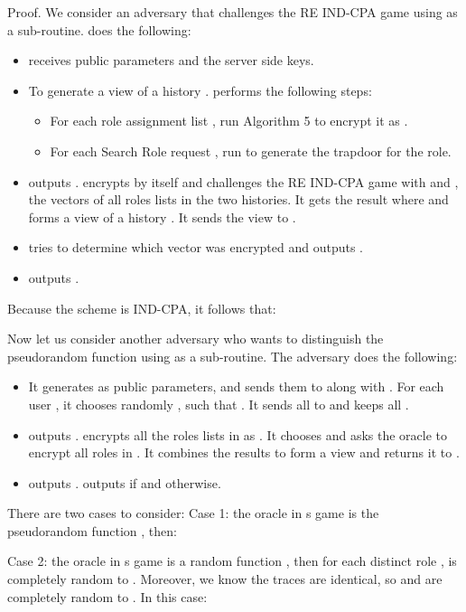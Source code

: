 \documentclass[final,5p,times,twocolumn]{elsarticle}
\begin{document}
Proof. We consider an adversary  that challenges the RE IND-CPA game using  as a sub-routine.  does the following:
\begin{itemize}
\item  receives public parameters  and the server side  keys. 


\item To generate a view of a history .  performs the following steps:
\begin{itemize}
\item For each role assignment list , run Algorithm 5 to encrypt it as . 
\item For each Search Role request , run  to generate the trapdoor  for the role.
\end{itemize}

\item  outputs .  encrypts  by itself and challenges the RE IND-CPA game with  and , the vectors of all roles lists in the two histories. It gets the result  where  and forms a view of a history . It sends the view to .

\item  tries to determine which vector was encrypted and outputs .

\item  outputs .

\end{itemize}

Because the  scheme is IND-CPA, it follows that:



Now let us consider another adversary  who wants to distinguish the
pseudorandom function  using  as a sub-routine. The adversary does the following:
\begin{itemize}
\item It generates  as public parameters, and sends them to  along with . For each user , it chooses randomly ,  such that . It sends all  to  and keeps all .
\item  outputs .  encrypts all the roles lists in  as . It chooses  and asks the oracle to encrypt all roles in . It combines the results to form a view  and returns it to .
\item  outputs .  outputs  if  and  otherwise.
\end{itemize}

There are two cases to consider:
Case 1: the oracle in s game is the pseudorandom function , then:



Case 2: the oracle in s game is a random function , then for each distinct
role ,  is completely random to . Moreover, we know the traces are identical, so  and  are completely random to . In this case:
\end{document}
